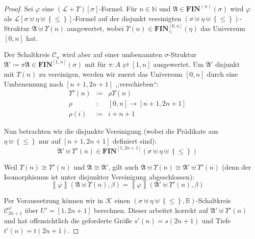 \begin{proof}
Sei $\varphi$ eine $\left(\mathcal{L}+\Upsilon\right)\left[\sigma\right]$-Formel.
Für $n\in\mathbb{N}$ und $\mathfrak{A}\in\mathbf{FIN}^{\left(n\right)}\left(\sigma\right)$
wird $\varphi$ als $\mathcal{L}\left[\sigma\uplus\eta\uplus\left\{ \leqslant\right\} \right]$-Formel
auf der disjunkt vereinigten $\left(\sigma\uplus\eta\uplus\left\{ \leqslant\right\} \right)$-Struktur
$\mathfrak{A}\uplus\Upsilon\left(n\right)$ ausgewertet, wobei $\Upsilon\left(n\right)\in\mathbf{FIN}_{<}^{\left[0,n\right]}\left(\eta\right)$
das Universum $\left[0,n\right]$ hat.

Der Schaltkreis $\mathcal{C}_{n}$ wird aber auf einer umbenannten
$\sigma$-Struktur $\mathfrak{A}'\coloneqq\pi\mathfrak{A}\in\mathbf{FIN}^{\left[1,n\right]}\left(\sigma\right)$
mit für $\pi:A\rightleftarrows\left[1,n\right]$ ausgewertet. Um $\mathfrak{A}'$
disjunkt mit $\Upsilon\left(n\right)$ zu vereinigen, werden wir zuerst
das Universum $\left[0,n\right]$ durch eine Umbenennung nach $\left[n+1,2n+1\right]$
,,verschieben``:
\begin{eqnarray*}
\Upsilon'\left(n\right) & \coloneqq & \rho\Upsilon\left(n\right)\\
\rho & : & \left[0,n\right]\rightarrow\left[n+1,2n+1\right]\\
\rho\left(i\right) & \coloneqq & i+n+1
\end{eqnarray*}

Nun betrachten wir die disjunkte Vereinigung (wobei die Prädikate
aus $\eta\uplus\left\{ \leqslant\right\} $ nur auf $\left[n+1,2n+1\right]$
definiert sind): 
\[
\mathfrak{A}'\uplus\Upsilon'\left(n\right)\in\mathbf{FIN}^{\left[1,2n+1\right]}\left(\sigma\uplus\eta\uplus\left\{ \leqslant\right\} \right)
\]

Weil $\Upsilon\left(n\right)\cong\Upsilon'\left(n\right)$ und $\mathfrak{A}\cong\mathfrak{A}'$,
gilt auch $\mathfrak{A}\uplus\Upsilon\left(n\right)\cong\mathfrak{A}'\uplus\Upsilon'\left(n\right)$
(denn der Isomorphismus ist unter disjunkter Vereinigung abgeschlossen):
\[
\left\llbracket \varphi\right\rrbracket \left(\mathfrak{A}\uplus\Upsilon\left(n\right),\beta\right)=\left\llbracket \varphi\right\rrbracket \left(\mathfrak{A}'\uplus\Upsilon'\left(n\right),\beta\right)
\]

Per Voraussetzung können wir in $\mathcal{K}$ einen $\left(\sigma\uplus\eta\uplus\left\{ \leqslant\right\} ,\mathbb{B}\right)$-Schaltkreis
$\mathcal{C}_{2n+1}^{\varphi}$ über $U'=\left[1,2n+1\right]$ berechnen.
Dieser arbeitet korrekt auf $\mathfrak{A}'\uplus\Upsilon'\left(n\right)$
und hat offensichtlich die geforderte Größe $s'\left(n\right)=s\left(2n+1\right)$
und Tiefe $t'\left(n\right)=t\left(2n+1\right)$.


\end{proof}
